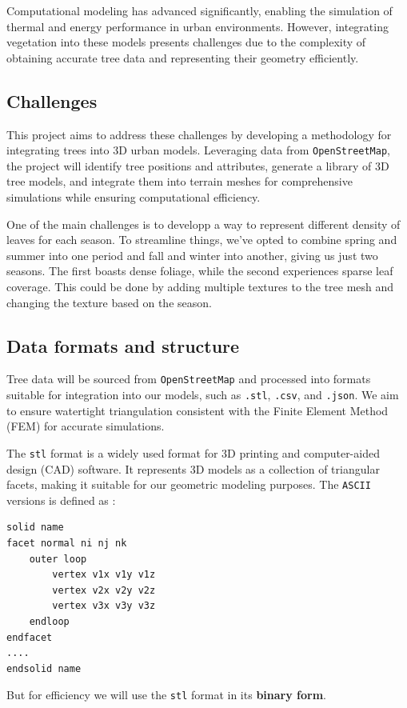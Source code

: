 \documentclass[12pt]{article}
\begin{document}
Computational modeling has advanced significantly, enabling the simulation of thermal
and energy performance in urban environments. However, integrating vegetation into
these models presents challenges due to the complexity of obtaining accurate tree data
and representing their geometry efficiently\cite{AdTree}.

\newpage

\subsection{Challenges}
This project aims to address these challenges by developing a methodology for
integrating trees into 3D urban models. Leveraging data from \texttt{OpenStreetMap},
the  project will identify tree positions and attributes, generate a library of 3D tree
models, and integrate them into terrain meshes for comprehensive simulations while
ensuring computational efficiency.

One of the main challenges is to developp a way to represent different density
of leaves for each season. To streamline things, we've opted to combine spring
and summer into one period and fall and winter into another, giving us just two
seasons. The first boasts dense foliage, while the second experiences sparse leaf coverage.
This could be done by adding multiple textures to the tree mesh and changing
the texture based on the season.

\subsection{Data formats and structure}
Tree data will be sourced from \texttt{OpenStreetMap} and processed into formats suitable for
integration into our models, such as \texttt{.stl}, \texttt{.csv}, and \texttt{.json}.
We aim to ensure watertight triangulation consistent with the Finite Element Method
(FEM) for accurate simulations.

The \texttt{stl} format\cite{stl_format} is a widely used format for 3D printing and computer-aided design (CAD)
software. It represents 3D models as a collection of triangular facets, making it
suitable for our geometric modeling purposes.
The \texttt{ASCII} versions is defined as :
\begin{lstlisting}
solid name
facet normal ni nj nk
    outer loop
        vertex v1x v1y v1z
        vertex v2x v2y v2z
        vertex v3x v3y v3z
    endloop
endfacet
....
endsolid name
\end{lstlisting}
But for efficiency we will use the \texttt{stl} format in its \textbf{binary form}.
\end{document}
